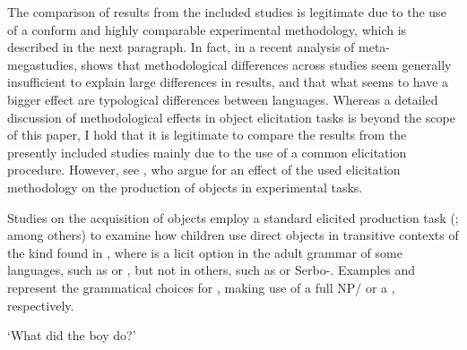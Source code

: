 \documentclass[output=paper,modfonts,newtxmath,hidelinks,]{langscibook}
\begin{document}
The comparison of results from the included studies is legitimate due to the use of a conform and highly comparable experimental methodology, which is described in the next paragraph. In fact, in a recent analysis of meta-megastudies, \citet{Myers2016} shows that methodological differences across studies seem generally insufficient to explain large differences in results, and that what seems to have a bigger effect are typological differences between languages. Whereas a detailed discussion of methodological effects in object elicitation tasks is beyond the scope of this paper, I hold that it is legitimate to compare the results from the presently included studies mainly due to the use of a common elicitation procedure. However, see \citet{Varlokosta-etal2016}, who argue for an effect of the used elicitation methodology on the production of  objects in experimental tasks.

Studies on the acquisition of objects employ a standard elicited production task (\citealt{Schaeffer2000,Perez-Leroux-etal2008,Radeva-Bork2012}; among others) to examine how children use direct objects in transitive contexts of the kind found in , where  is a licit option in the adult grammar of some languages, such as  or , but not in others, such as  or Serbo-. Examples  and  represent the grammatical choices for , making use of a full NP/ or a , respectively.

\ea `What did the boy do?'\label{17:ex4}
	\z
\z
\end{document}
